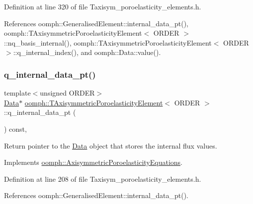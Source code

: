 Definition at line 320 of file Taxisym\+\_\+poroelasticity\+\_\+elements.\+h.



References oomph\+::\+Generalised\+Element\+::internal\+\_\+data\+\_\+pt(), oomph\+::\+T\+Axisymmetric\+Poroelasticity\+Element$<$ O\+R\+D\+E\+R $>$\+::nq\+\_\+basis\+\_\+internal(), oomph\+::\+T\+Axisymmetric\+Poroelasticity\+Element$<$ O\+R\+D\+E\+R $>$\+::q\+\_\+internal\+\_\+index(), and oomph\+::\+Data\+::value().

\mbox{\label{classoomph_1_1TAxisymmetricPoroelasticityElement_a294374f01ed46c7ea77553234bb37c88}} 
\subsubsection{\texorpdfstring{q\+\_\+internal\+\_\+data\+\_\+pt()}{q\_internal\_data\_pt()}}
{\footnotesize\ttfamily template$<$unsigned O\+R\+D\+ER$>$ \\
\hyperlink{classoomph_1_1Data}{Data}$\ast$ \hyperlink{classoomph_1_1TAxisymmetricPoroelasticityElement}{oomph\+::\+T\+Axisymmetric\+Poroelasticity\+Element}$<$ O\+R\+D\+ER $>$\+::q\+\_\+internal\+\_\+data\+\_\+pt (\begin{DoxyParamCaption}{ }\end{DoxyParamCaption}) const\hspace{0.3cm}{\ttfamily [inline]}, {\ttfamily [virtual]}}



Return pointer to the \hyperlink{classoomph_1_1Data}{Data} object that stores the internal flux values. 



Implements \hyperlink{classoomph_1_1AxisymmetricPoroelasticityEquations_ada5518ffc248b4c0ea00629c6376cb5c}{oomph\+::\+Axisymmetric\+Poroelasticity\+Equations}.



Definition at line 208 of file Taxisym\+\_\+poroelasticity\+\_\+elements.\+h.



References oomph\+::\+Generalised\+Element\+::internal\+\_\+data\+\_\+pt().

